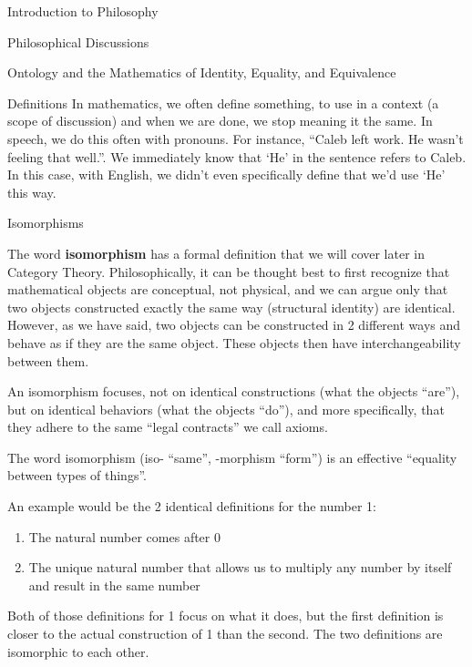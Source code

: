 \begin{chapter}{Introduction to Philosophy}
\begin{section}{Philosophical Discussions}
\begin{subsection}{Ontology and the Mathematics of Identity, Equality, and Equivalence}
\begin{subsubsection}{Definitions}
                In mathematics, we often define something, to use in a context (a scope of discussion) and when we are done, we stop meaning it the same. In speech, we do this often with pronouns. For instance, ``Caleb left work. He wasn't feeling that well.''. We immediately know that `He' in the sentence refers to Caleb. In this case, with English, we didn't even specifically define that we'd use `He' this way.
            \end{subsubsection}
                
                
            \begin{subsubsection}{Isomorphisms}
                \begin{definition}
                    The word \textbf{isomorphism} has a formal definition that we will cover later in Category Theory. Philosophically, it can be thought best to first recognize that mathematical objects are conceptual, not physical, and we can argue only that two objects constructed exactly the same way (structural identity) are identical. However, as we have said, two objects can be constructed in 2 different ways and behave as if they are the same object. These objects then have interchangeability between them.
                    
                    An isomorphism focuses, not on identical constructions (what the objects ``are''), but on identical behaviors (what the objects ``do''), and more specifically, that they adhere to the same ``legal contracts'' we call axioms.
                    
                    The word isomorphism (iso- ``same'', -morphism ``form'') is an effective ``equality between types of things''. 
                \end{definition}
                
                An example would be the 2 identical definitions for the number 1:
                \begin{enumerate}
                    \item The natural number comes after 0
                    \item The unique natural number that allows us to multiply any number by itself and result in the same number
                \end{enumerate}
                
                Both of those definitions for 1 focus on what it does, but the first definition is closer to the actual construction of 1 than the second. The two definitions are isomorphic to each other.
                    

\end{subsubsection}
\end{subsection}
\end{section}
\end{chapter}
